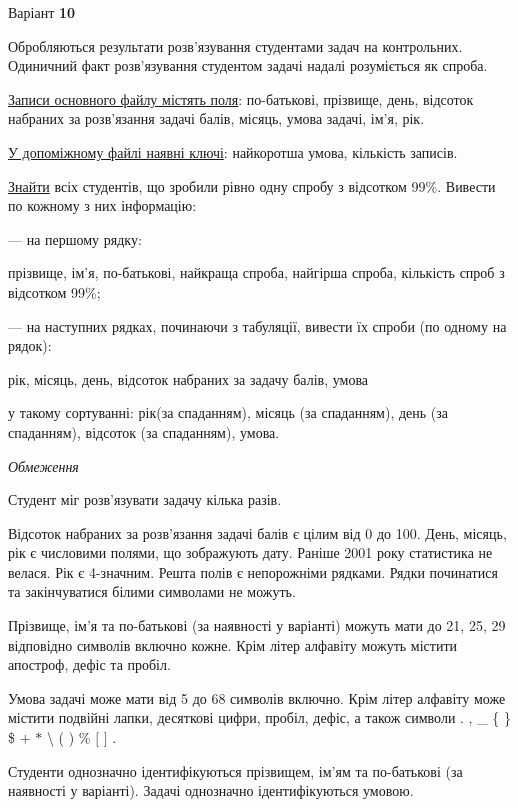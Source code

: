 \documentclass[11pt, ukrainian]{article}
\begin{document}
\par
\newpage
{\center Варіант  \No \textbf { 10 }\par}
\bigskip
Обробляються результати розв’язування студентами задач на контрольних.
Одиничний факт роз\-в’я\-зу\-вання студентом задачі надалі розуміється як спроба.

\underline{Записи основного файлу містять поля}: по-батькові, прізвище, день, відсоток набраних за розв’язан\-ня задачі балів, місяць, умова задачі, ім’я, рік.

\underline{У допоміжному файлі наявні ключі}: найкоротша умова, кількість записів.

\underline{Знайти} всіх студентів, що зробили рівно одну спробу з відсотком 99\%. Вивести по кожному з них інформацію:\par
{\noindent}--- на першому рядку:\par
прізвище, ім’я, по-батькові, найкраща спроба, найгірша спроба, кількість спроб з відсотком 99\%;

{\noindent}--- на наступних рядках, починаючи з табуляції, вивести їх спроби (по одному на рядок):\par
рік, місяць, день, відсоток набраних за задачу балів, умова

{\noindent}у такому сортуванні: рік(за спаданням), місяць (за спаданням), день (за спаданням), відсоток (за спаданням), умова.


\bigskip\textit{Обмеження}

Студент міг розв’язувати задачу кілька разів.

Відсоток набраних за розв’язання задачі балів є цілим від 0 до 100.
День, місяць, рік є числовими полями, що зображують дату.
Раніше 2001 року статистика не велася. Рік є 4-значним.
Решта полів є непорожніми рядками.
Рядки починатися та закінчуватися білими символами не можуть.

Прізвище, ім’я та по-батькові (за наявності у варіанті) можуть мати до 21, 25, 29 відповідно символів включно кожне. 
Крім літер алфавіту можуть містити апостроф, дефіс та пробіл.

Умова задачі може мати від 5 до 68 символів включно.
Крім літер алфавіту може містити подвійні лапки, десяткові цифри, пробіл, дефіс,
а також символи . , \_ \{ \} \$ $+$ $*$ {\textbackslash} ( ) \% $[$ $]$ .

Студенти однозначно ідентифікуються прізвищем, ім’ям та по-батькові (за наявності у варіанті).
Задачі однозначно ідентифікуються умовою.
\end{document}
